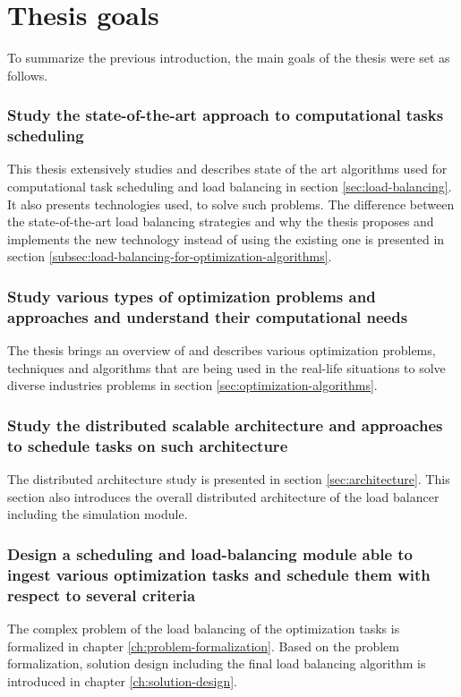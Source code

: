 \section{Thesis goals}\label{sec:thesis-goals}
To summarize the previous introduction,
the main goals of the thesis were set as follows.

\subsubsection{Study the state-of-the-art approach to computational tasks scheduling}
This thesis extensively studies and describes state of the art algorithms used for computational task scheduling
and load balancing in section \ref{sec:load-balancing}. 
It also presents technologies used, to solve such problems.
The difference between the state-of-the-art load balancing strategies
and why the thesis proposes and implements the new technology instead of using the existing one
is presented in section \ref{subsec:load-balancing-for-optimization-algorithms}.

\subsubsection{Study various types of optimization problems and approaches and understand their computational needs}
The thesis brings an overview of and describes various optimization problems, techniques and algorithms 
that are being used in the real-life situations to solve diverse industries problems 
in section \ref{sec:optimization-algorithms}.

\subsubsection{Study the distributed scalable architecture and approaches to schedule tasks on such architecture}

The distributed architecture study is presented in section \ref{sec:architecture}.
This section also introduces the overall distributed architecture of the load balancer
including the simulation module.

\subsubsection{Design a scheduling and load-balancing module able to ingest various optimization tasks and schedule them with respect to several criteria}
The complex problem of the load balancing of the optimization tasks is formalized in chapter \ref{ch:problem-formalization}.
Based on the problem formalization,
solution design including the final load balancing algorithm is introduced in chapter \ref{ch:solution-design}.

